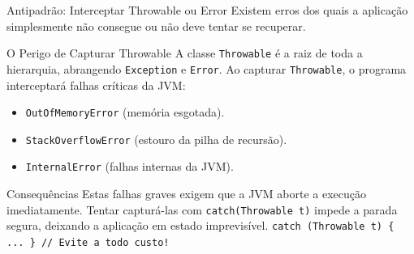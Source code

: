 \documentclass[9pt]{beamer}
\begin{document}
\begin{frame}[fragile]{Antipadrão: Interceptar Throwable ou Error}
    Existem erros dos quais a aplicação simplesmente não consegue ou não deve tentar se recuperar.
    
    \vspace{0.2cm}
    
    \begin{block}{O Perigo de Capturar Throwable}
        A classe \texttt{Throwable} é a raiz de toda a hierarquia, abrangendo \texttt{Exception} e \texttt{Error}.
        Ao capturar \texttt{Throwable}, o programa interceptará falhas críticas da JVM:
        \begin{itemize}
            \item \texttt{OutOfMemoryError} (memória esgotada).
            \item \texttt{StackOverflowError} (estouro da pilha de recursão).
            \item \texttt{InternalError} (falhas internas da JVM).
        \end{itemize}
    \end{block}
    
    \begin{block}{Consequências}
        Estas falhas graves exigem que a JVM aborte a execução imediatamente. Tentar capturá-las com \texttt{catch(Throwable t)} impede a parada segura, deixando a aplicação em estado imprevisível.
        \centering\scriptsize
        \texttt{catch (Throwable t) \{ ... \} // Evite a todo custo!}
    \end{block}
\end{frame}
\end{document}
